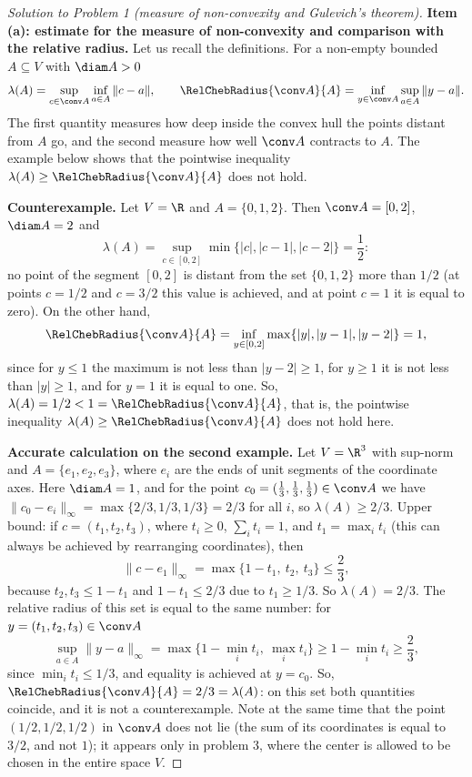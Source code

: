 \documentclass[a4paper,12pt]{report}
\begin{document}
\begin{proof}[Solution to Problem \textup{1} \textup{(}measure of non-convexity and Gulevich's theorem\textup{)}]

\textbf{Item \textup{(a)}: estimate for the measure of non-convexity and comparison with the relative radius.} Let us recall the definitions. For a non-empty bounded $A \subseteq V$ with $\diam A > 0$
\[
\lambda(A) = \sup_{c \in \conv A} \inf_{a \in A} \|c - a\|, \qquad
\RelChebRadius{\conv A}{A} = \inf_{y \in \conv A} \sup_{a \in A} \|y - a\|.
\]
The first quantity measures how deep inside the convex hull the points distant from $A$ go, and the second measure how well $\conv A$ contracts to $A$. The example below shows that the pointwise inequality $\lambda(A) \ge \RelChebRadius{\conv A}{A}$ does not hold.

\textbf{Counterexample.} Let $V = \R$ and $A = \{0, 1, 2\}$. Then $\conv A = [0,2]$, $\diam A = 2$ and
\[
\lambda(A) = \sup_{c \in [0,2]} \min\{|c|, |c-1|, |c-2|\} = \frac12:
\]
no point of the segment $[0,2]$ is distant from the set $\{0,1,2\}$ more than $1/2$ \textup{(}at points $c = 1/2$ and $c = 3/2$ this value is achieved, and at point $c = 1$ it is equal to zero\textup{)}. On the other hand,
\[
\RelChebRadius{\conv A}{A} = \inf_{y \in [0,2]} \max\{|y|, |y-1|, |y-2|\} = 1,
\]
since for $y \le 1$ the maximum is not less than $|y - 2| \ge 1$, for $y \ge 1$ it is not less than $|y| \ge 1$, and for $y = 1$ it is equal to one. So, $\lambda(A) = 1/2 < 1 = \RelChebRadius{\conv A}{A}$, that is, the pointwise inequality $\lambda(A) \ge \RelChebRadius{\conv A}{A}$ does not hold here.

\textbf{Accurate calculation on the second example.} Let $V = \R^3$ with sup-norm and $A = \{e_1, e_2, e_3\}$, where $e_i$ are the ends of unit segments of the coordinate axes. Here $\diam A = 1$, and for the point $c_0 = (\frac13, \frac13, \frac13) \in \conv A$ we have $\|c_0 - e_i\|_\infty = \max\{2/3, 1/3, 1/3\} = 2/3$ for all $i$, so $\lambda(A) \ge 2/3$. Upper bound: if $c = (t_1, t_2, t_3)$, where $t_i \ge 0$, $\sum_i t_i = 1$, and $t_1 = \max_i t_i$ \textup{(}this can always be achieved by rearranging coordinates\textup{)}, then
\[
\|c - e_1\|_\infty = \max\{1 - t_1,\ t_2,\ t_3\} \le \frac23,
\]
because $t_2, t_3 \le 1 - t_1$ and $1 - t_1 \le 2/3$ due to $t_1 \ge 1/3$. So $\lambda(A) = 2/3$. The relative radius of this set is equal to the same number: for $y = (t_1,t_2,t_3) \in \conv A$
\[
\sup_{a \in A} \|y - a\|_\infty = \max\bigl\{1 - \min_i t_i,\ \max_i t_i\bigr\} \ge 1 - \min_i t_i \ge \frac23,
\]
since $\min_i t_i \le 1/3$, and equality is achieved at $y = c_0$. So, $\RelChebRadius{\conv A}{A} = 2/3 = \lambda(A)$: on this set both quantities coincide, and it is not a counterexample. Note at the same time that the point $(1/2,1/2,1/2)$ in $\conv A$ does not lie \textup{(}the sum of its coordinates is equal to $3/2$, and not $1$\textup{)}; it appears only in problem \textup{3}, where the center is allowed to be chosen in the entire space $V$.


\end{proof}
\end{document}
